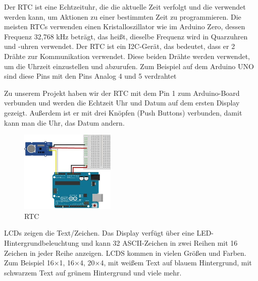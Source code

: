 \documentclass[conference]{IEEEtran}
\begin{document}
Der RTC ist eine Echtzeituhr, die die aktuelle Zeit verfolgt und die verwendet werden kann, um Aktionen zu einer bestimmten Zeit zu programmieren. Die meisten RTCs verwenden einen Kristalloszillator wie im Arduino Zero, dessen Frequenz 32,768 kHz beträgt, das heißt, dieselbe Frequenz wird in Quarzuhren und -uhren verwendet. 
Der RTC ist ein I2C-Gerät, das bedeutet, dass er 2 Drähte zur Kommunikation verwendet. Diese beiden Drähte werden verwendet, um die Uhrzeit einzustellen und abzurufen. Zum Beispiel auf dem Arduino UNO sind diese Pins mit den Pins Analog 4 und 5 verdrahtet

Zu unserem Projekt haben wir der RTC mit dem Pin 1 zum Arduino-Board verbunden und werden die Echtzeit Uhr und Datum auf dem ersten Display gezeigt. Außerdem ist er mit drei Knöpfen (Push Buttons) verbunden, damit kann man die Uhr, das Datum andern. 

\begin{figure}
	\centering
	\includegraphics[width=0.7\linewidth]{fig30}
	\caption{RTC}
	\label{fig:fig30}
\end{figure}

LCDs zeigen die Text/Zeichen. Das Display verfügt über eine LED-Hintergrundbeleuchtung und kann 32 ASCII-Zeichen in zwei Reihen mit 16 Zeichen in jeder Reihe anzeigen.
LCDS kommen in vielen Größen und Farben. Zum Beispiel 16×1, 16×4, 20×4, mit weißem Text auf blauem Hintergrund, mit schwarzem Text auf grünem Hintergrund und viele mehr.
\end{document}
